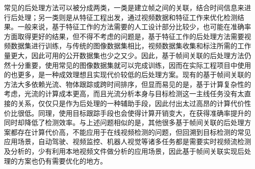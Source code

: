 \documentclass[winfonts,master,twoside,AutoFakeBold= {2}]{njuthesis}
\begin{document}
常见的后处理方法可以被分成两类，一类是建立帧之间的关联，结合时间信息来进行后处理；另一类则是从特征工程出发，通过视频数据和特征工作来优化检测结果。一般来说，基于特征工作的方法需要的人工设计部分比较少，也可能在准确率方面取得更好的结果，但不得不考虑的问题是，基于特征工作的后处理方法需要视频数据集进行训练，与传统的图像数据集相比，视频数据集收集和标注所需的工作量更大，因此可用的公开数据集也少之又少。因此，基于帧间关联的后处理方法仍然十分重要，使用常见的图像数据集就可以完成训练，因而在实际工程项目中使用的也更多，是一种成效理想且实现代价较低的后处理方案。现有的基于帧间关联的方法大多依赖光流、物体跟踪或跨时间排序，但显而易见的是，基于计算复杂性的考虑，光流的计算成本更高，而且光流分析本身与目标检测这一主线任务没有太直接的关系，仅仅只是作为后处理的一种辅助手段，因此付出太过高昂的计算代价性价比很低。同理，使用目标跟踪手段也会使得计算开销变大，在获得准确率提升的同时却降低了检测效率。与上述问题相似的是，其他很多基于帧间关联的后处理方案都存在计算代价高，不能应用于在线视频检测的问题，但回溯到目标检测的常见应用场景，自动驾驶、视频监控、机器人视觉等诸多任务都是需要实时视频流检测及分析的，少有利用本地视频文件做分析的应用场景，因此基于帧间关联实现后处理的方案也仍有需要优化的地方。
\end{document}
